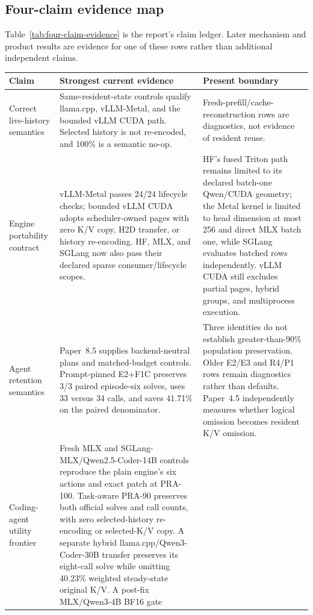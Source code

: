 \documentclass[11pt]{article}
\begin{document}
\subsection{Four-claim evidence map}

Table~\ref{tab:four-claim-evidence} is the report's claim ledger.  Later
mechanism and product results are evidence for one of these rows rather than
additional independent claims.

\begin{table}[H]
\centering
\scriptsize
\begin{tabularx}{\linewidth}{p{.21\linewidth}Yp{.25\linewidth}}
\toprule
Claim & Strongest current evidence & Present boundary \\
\midrule
Correct live-history semantics & Same-resident-state controls qualify llama.cpp,
vLLM-Metal, and the bounded vLLM CUDA path.  Selected history is not re-encoded,
and 100\% is a semantic no-op. & Fresh-prefill/cache-reconstruction rows are
diagnostics, not evidence of resident reuse. \\
Engine portability contract & vLLM-Metal passes 24/24 lifecycle checks; bounded
vLLM CUDA adopts scheduler-owned pages with zero K/V copy, H2D transfer, or
history re-encoding.  HF, MLX, and SGLang now also pass their declared sparse
consumer/lifecycle scopes. & HF's fused Triton path remains limited to its
declared batch-one Qwen/CUDA geometry; the Metal kernel is limited to head
dimension at most 256 and direct MLX batch one, while SGLang evaluates batched
rows independently.  vLLM CUDA still excludes partial pages, hybrid groups,
and multiprocess execution. \\
Agent retention semantics & Paper~8.5 supplies backend-neutral plans and
matched-budget controls.  Prompt-pinned E2+F1C preserves 3/3 paired
episode-six solves, uses 33 versus 34 calls, and saves 41.71\% on the paired
denominator. & Three identities do not establish greater-than-90\% population
preservation.  Older E2/E3 and R4/P1 rows remain diagnostics rather than
defaults.  Paper~4.5 independently measures whether logical omission becomes
resident K/V omission. \\
Coding-agent utility frontier & Fresh MLX and SGLang-MLX/Qwen2.5-Coder-14B
controls reproduce the plain engine's six actions and exact patch at PRA-100.
Task-aware PRA-90 preserves both official solves and call counts, with zero
selected-history re-encoding or selected-K/V copy.  A separate hybrid
llama.cpp/Qwen3-Coder-30B transfer preserves its eight-call solve while omitting
40.23\% weighted steady-state original K/V.  A post-fix MLX/Qwen3-4B BF16 gate

\end{tabularx}
\end{table}
\end{document}
